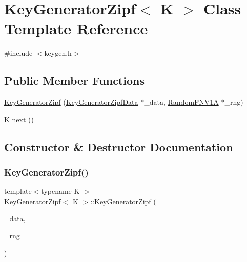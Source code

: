 \hypertarget{classKeyGeneratorZipf}{}\section{Key\+Generator\+Zipf$<$ K $>$ Class Template Reference}
\label{classKeyGeneratorZipf}


{\ttfamily \#include $<$keygen.\+h$>$}

\subsection*{Public Member Functions}
\begin{DoxyCompactItemize}
\item 
\hyperlink{classKeyGeneratorZipf_a0b3f51602e77f6047d281564e31e0195}{Key\+Generator\+Zipf} (\hyperlink{classKeyGeneratorZipfData}{Key\+Generator\+Zipf\+Data} $\ast$\+\_\+data, \hyperlink{classRandomFNV1A}{Random\+F\+N\+V1A} $\ast$\+\_\+rng)
\item 
K \hyperlink{classKeyGeneratorZipf_aaefdd0a14c9380d8cf266ae235002c1b}{next} ()
\end{DoxyCompactItemize}


\subsection{Constructor \& Destructor Documentation}
\mbox{\label{classKeyGeneratorZipf_a0b3f51602e77f6047d281564e31e0195}} 
\subsubsection{\texorpdfstring{Key\+Generator\+Zipf()}{KeyGeneratorZipf()}}
{\footnotesize\ttfamily template$<$typename K $>$ \\
\hyperlink{classKeyGeneratorZipf}{Key\+Generator\+Zipf}$<$ K $>$\+::\hyperlink{classKeyGeneratorZipf}{Key\+Generator\+Zipf} (\begin{DoxyParamCaption}\item[{\hyperlink{classKeyGeneratorZipfData}{Key\+Generator\+Zipf\+Data} $\ast$}]{\+\_\+data,  }\item[{\hyperlink{classRandomFNV1A}{Random\+F\+N\+V1A} $\ast$}]{\+\_\+rng }\end{DoxyParamCaption})\hspace{0.3cm}{\ttfamily [inline]}}



